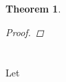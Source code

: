 \documentclass[]{article}
\newcommand{\N}{\mathbb{N}}
\newcommand{\divisible}{ \ \vdots \ }
\newcommand{\st}{\ : \ }
\newtheorem{theorem}{Theorem}
\begin{document}
\begin{theorem}
\begin{proof}
        
        
        

        


    \end{proof}
\end{theorem}




\newpage
\section{}
Let 
\end{document}
